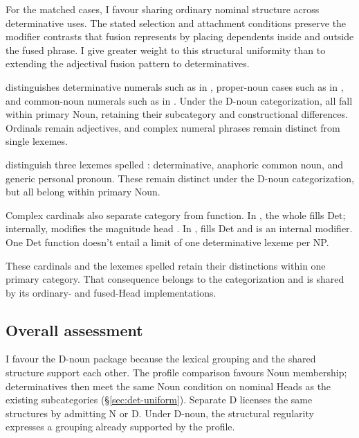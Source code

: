 \documentclass[12pt]{article}
\begin{document}
For the matched cases, I favour sharing ordinary nominal structure across determinative uses. The stated selection and attachment conditions preserve the modifier contrasts that fusion represents by placing dependents inside and outside the fused phrase. I give greater weight to this structural uniformity than to extending the adjectival fusion pattern to determinatives.

\textcite{reynolds2026numerals} distinguishes determinative numerals such as  in , proper-noun cases such as  in , and common-noun numerals such as  in . Under the D-noun categorization, all fall within primary Noun, retaining their subcategory and constructional differences. Ordinals remain adjectives, and complex numeral phrases remain distinct from single lexemes.

\textcite[797--798]{payne2013anaphoric} distinguish three lexemes spelled : determinative, anaphoric common noun, and generic personal pronoun. These remain distinct under the D-noun categorization, but all belong within primary Noun.

Complex cardinals also separate category from function. In , the whole  fills Det; internally,  modifies the magnitude head  \citep[§4]{reynolds2026numerals}. In ,  fills Det and  is an internal modifier. One Det function doesn't entail a limit of one determinative lexeme per NP.

These cardinals and the lexemes spelled  retain their distinctions within one primary category. That consequence belongs to the categorization and is shared by its ordinary- and fused-Head implementations.

\subsection{Overall assessment}\label{sec:overall-assessment}

I favour the D-noun package because the lexical grouping and the shared structure support each other. The profile comparison favours Noun membership; determinatives then meet the same Noun condition on nominal Heads as the existing subcategories (§\ref{sec:det-uniform}). Separate D licenses the same structures by admitting N or D. Under D-noun, the structural regularity expresses a grouping already supported by the profile.
\end{document}
